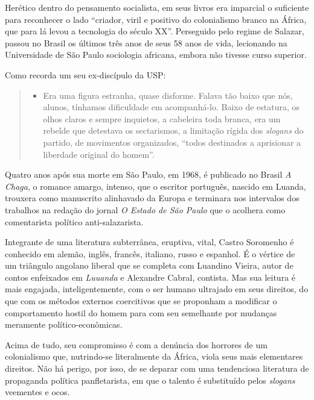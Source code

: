 \documentclass[
  letterpaper,
  DIV=11,
  numbers=noendperiod]{scrreprt}
\providecommand{\tightlist}{%
  \setlength{\itemsep}{0pt}\setlength{\parskip}{0pt}}\usepackage{longtable,booktabs,array}
\begin{document}
Herético dentro do pensamento socialista, em seus livros era imparcial o
suficiente para reconhecer o lado ``criador, viril e positivo do
colonialismo branco na África, que para lá levou a tecnologia do século
XX''. Perseguido pelo regime de Salazar, passou no Brasil os últimos
três anos de seus 58 anos de vida, lecionando na Universidade de São
Paulo sociologia africana, embora não tivesse curso superior.

Como recorda um seu ex-discípulo da USP:

\begin{quote}
\begin{itemize}
\tightlist
\item
  Era uma figura estranha, quase disforme. Falava tão baixo que nós,
  alunos, tínhamos dificuldade em acompanhá-lo. Baixo de estatura, os
  olhos claros e sempre inquietos, a cabeleira toda branca, era um
  rebelde que detestava os sectarismos, a limitação rígida dos
  \emph{slogans} do partido, de movimentos organizados, ``todos
  destinados a aprisionar a liberdade original do homem''.
\end{itemize}
\end{quote}

Quatro anos após sua morte em São Paulo, em 1968, é publicado no Brasil
\emph{A Chaga}, o romance amargo, intenso, que o escritor português,
nascido em Luanda, trouxera como manuscrito alinhavado da Europa e
terminara nos intervalos dos trabalhos na redação do jornal \emph{O
Estado de São Paulo} que o acolhera como comentarista político
anti-salazarista.

Integrante de uma literatura subterrânea, eruptiva, vital, Castro
Soromenho é conhecido em alemão, inglês, francês, italiano, russo e
espanhol. É o vértice de um triângulo angolano liberal que se completa
com Luandino Vieira, autor de contos enfeixados em \emph{Luuanda} e
Alexandre Cabral, contista. Mas sua leitura é mais engajada,
inteligentemente, com o ser humano ultrajado em seus direitos, do que
com os métodos externos coercitivos que se proponham a modificar o
comportamento hostil do homem para com seu semelhante por mudanças
meramente político-econômicas.

Acima de tudo, seu compromisso é com a denúncia dos horrores de um
colonialismo que, nutrindo-se literalmente da África, viola seus mais
elementares direitos. Não há perigo, por isso, de se deparar com uma
tendenciosa literatura de propaganda política panfletarista, em que o
talento é substituído pelos \emph{slogans} veementes e ocos.
\end{document}
